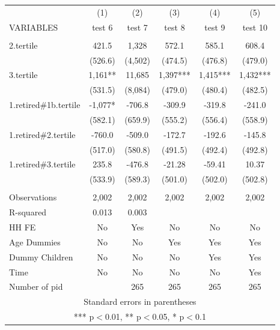 \begin{tabular}{lccccc} \hline
 & (1) & (2) & (3) & (4) & (5) \\
VARIABLES & test 6 & test 7 & test 8 & test 9 & test 10 \\ \hline
 &  &  &  &  &  \\
2.tertile & 421.5 & 1,328 & 572.1 & 585.1 & 608.4 \\
 & (526.6) & (4,502) & (474.5) & (476.8) & (479.0) \\
3.tertile & 1,161** & 11,685 & 1,397*** & 1,415*** & 1,432*** \\
 & (531.5) & (8,084) & (479.0) & (480.4) & (482.5) \\
1.retired\#1b.tertile & -1,077* & -706.8 & -309.9 & -319.8 & -241.0 \\
 & (582.1) & (659.9) & (555.2) & (556.4) & (558.9) \\
1.retired\#2.tertile & -760.0 & -509.0 & -172.7 & -192.6 & -145.8 \\
 & (517.0) & (580.8) & (491.5) & (492.4) & (492.8) \\
1.retired\#3.tertile & 235.8 & -476.8 & -21.28 & -59.41 & 10.37 \\
 & (533.9) & (589.3) & (501.0) & (502.0) & (502.8) \\
 &  &  &  &  &  \\
Observations & 2,002 & 2,002 & 2,002 & 2,002 & 2,002 \\
R-squared & 0.013 & 0.003 &  &  &  \\
HH FE & No & Yes & No & No & No \\
Age Dummies & No & No & Yes & Yes & Yes \\
Dummy Children & No & No & No & Yes & Yes \\
Time & No & No & No & No & Yes \\
 Number of pid &  & 265 & 265 & 265 & 265 \\ \hline
\multicolumn{6}{c}{ Standard errors in parentheses} \\
\multicolumn{6}{c}{ *** p$<$0.01, ** p$<$0.05, * p$<$0.1} \\
\end{tabular}
